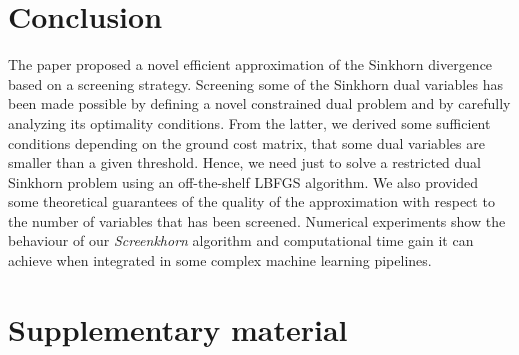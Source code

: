 \documentclass{article}
\begin{document}
\section{Conclusion}
The paper proposed a novel efficient approximation of the Sinkhorn divergence
based on a screening strategy. Screening some of the Sinkhorn dual variables
has been made possible by defining a novel constrained dual problem and by 
carefully analyzing its optimality conditions. From the latter, we derived some
sufficient conditions depending on the ground cost matrix, that some dual variables are smaller than a given threshold. Hence, we need just to solve a restricted
dual Sinkhorn problem using an off-the-shelf LBFGS algorithm. We also provided
some theoretical guarantees of the quality of the approximation with respect to
the number of variables that has been screened. Numerical experiments show 
the behaviour of our \emph{Screenkhorn} algorithm and computational time gain it can
achieve when integrated in some complex machine learning pipelines.





\small



\newpage
\section{Supplementary material}

\end{document}
